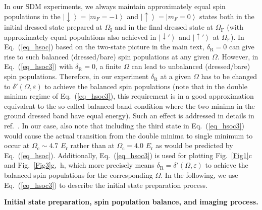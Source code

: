 \documentclass[showpacs,preprintnumbers,amsmath,amssymb, superscriptaddress, aps, reprint]{revtex4-1}
\def\E_r{E_{\text{r}}}
\def\deltaR{\delta_{\text{R}}}
\def\OmegaF{\Omega_{\text{F}}}
\def\OmegaI{\Omega_{\text{I}}}
\begin{document}
{{{In our SDM experiments, we always maintain approximately equal spin populations in the $\left|  \downarrow  \right\rangle  = \left| {{m_F} =  - 1} \right\rangle$ and $\left|  \uparrow  \right\rangle  = \left| {{m_F} = 0} \right\rangle$ states both in the initial dressed state prepared at $\OmegaI$ and in the final dressed state at $\OmegaF$ (with approximately equal populations also achieved in $\left| \downarrow' \right\rangle$ and $\left| \uparrow'  \right\rangle$ at $\OmegaF$). In Eq.~(\ref{eq_hsoc}) based on the two-state picture in the main text, ${\deltaR} = 0$ can give rise to such balanced (dressed/bare) spin populations at any given $\Omega$. However, in Eq.~(\ref{eq_hsoc3}) with ${\deltaR} = 0$, a finite $\Omega$ can lead to unbalanced (dressed/bare) spin populations. Therefore, in our experiment $\deltaR$ at a given $\Omega$ has to be changed to $\delta '(\Omega ,\varepsilon )$ to achieve the balanced spin populations (note that in the double minima regime of Eq.~(\ref{eq_hsoc3}), this requirement is in a good approximation equivalent to the so-called balanced band condition where the two minima in the ground dressed band have equal energy). Such an effect is addressed in details in ref.~\cite{Lin_SOC_Nature_2011}. In our case, also note that including the third state in Eq.~(\ref{eq_hsoc3}) would cause the actual transition from the double minima to single minimum to occur at $\Omega_{\text{c}} \sim 4.7$ $\E_r$ rather than at $\Omega_{\text{c}} = 4.0$ $\E_r$ as would be predicted by Eq.~(\ref{eq_hsoc}). Additionally, Eq.~(\ref{eq_hsoc3}) is used for plotting Fig.~\ref{Fig1}c and {Fig.~{\ref{Fig3}}g,~h, which} more precisely means ${\deltaR} = \delta '(\Omega ,\varepsilon )$ to achieve the balanced spin populations for the corresponding $\Omega$. In the following, we use Eq.~(\ref{eq_hsoc3}) to describe the initial state preparation process.

\vspace{5mm}

\textbf{Initial state preparation, spin population balance, and imaging process.} 

}}}
\end{document}
